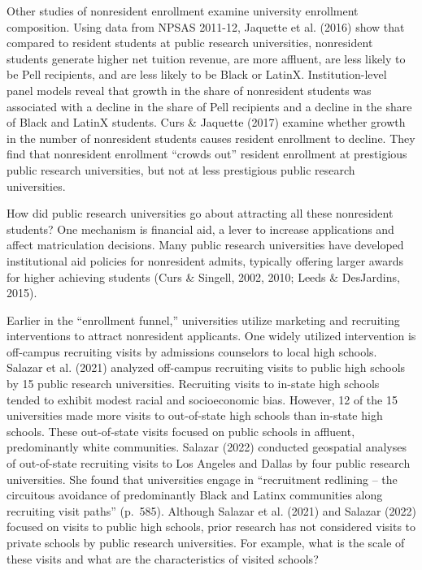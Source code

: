 \documentclass[
  12pt,
]{article}
\begin{document}
Other studies of nonresident enrollment examine university enrollment composition. Using data from NPSAS 2011-12, Jaquette et al. (2016) show that compared to resident students at public research universities, nonresident students generate higher net tuition revenue, are more affluent, are less likely to be Pell recipients, and are less likely to be Black or LatinX. Institution-level panel models reveal that growth in the share of nonresident students was associated with a decline in the share of Pell recipients and a decline in the share of Black and LatinX students. Curs \& Jaquette (2017) examine whether growth in the number of nonresident students causes resident enrollment to decline. They find that nonresident enrollment ``crowds out'' resident enrollment at prestigious public research universities, but not at less prestigious public research universities.

How did public research universities go about attracting all these nonresident students? One mechanism is financial aid, a lever to increase applications and affect matriculation decisions. Many public research universities have developed institutional aid policies for nonresident admits, typically offering larger awards for higher achieving students (Curs \& Singell, 2002, 2010; Leeds \& DesJardins, 2015).

Earlier in the ``enrollment funnel,'' universities utilize marketing and recruiting interventions to attract nonresident applicants. One widely utilized intervention is off-campus recruiting visits by admissions counselors to local high schools. Salazar et al. (2021) analyzed off-campus recruiting visits to public high schools by 15 public research universities. Recruiting visits to in-state high schools tended to exhibit modest racial and socioeconomic bias. However, 12 of the 15 universities made more visits to out-of-state high schools than in-state high schools. These out-of-state visits focused on public schools in affluent, predominantly white communities. Salazar (2022) conducted geospatial analyses of out-of-state recruiting visits to Los Angeles and Dallas by four public research universities. She found that universities engage in ``recruitment redlining -- the circuitous avoidance of predominantly Black and Latinx communities along recruiting visit paths'' (p.~585). Although Salazar et al. (2021) and Salazar (2022) focused on visits to public high schools, prior research has not considered visits to private schools by public research universities. For example, what is the scale of these visits and what are the characteristics of visited schools?
\end{document}
